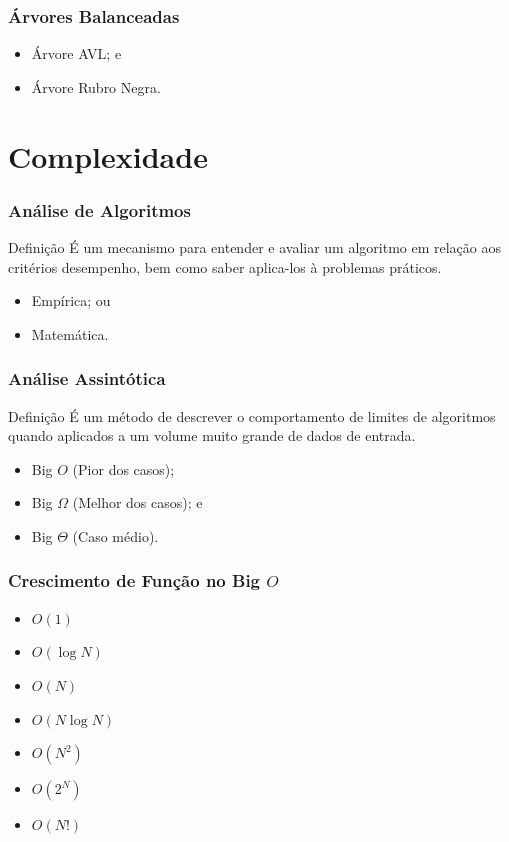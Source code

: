 \documentclass{beamer}
\begin{document}
\begin{frame}
\frametitle{Árvores Balanceadas}
\begin{itemize}
	\item Árvore AVL; e
	\item Árvore Rubro Negra.
\end{itemize}
\end{frame}

\section{Complexidade}

\begin{frame}
\frametitle{Análise de Algoritmos}

\begin{block}{Definição}
É um mecanismo para entender e avaliar um algoritmo em relação aos critérios desempenho, bem como saber aplica-los à problemas práticos.
\end{block}\vfill

\begin{itemize}
	\item Empírica; ou 
	\item Matemática.
\end{itemize}
\end{frame}

\begin{frame}
\frametitle{Análise Assintótica}

\begin{block}{Definição}
É um método de descrever o comportamento de limites de algoritmos quando aplicados a um volume muito grande de dados de entrada.
\end{block}\vfill

\begin{itemize}
	\item Big $O$ (Pior dos casos);
	\item Big $\Omega$ (Melhor dos casos); e
	\item Big $\Theta$ (Caso médio).
\end{itemize}
\end{frame}

\begin{frame}
\frametitle{Crescimento de Função no Big $O$}
\begin{itemize}
	\item $O(1)$
	\item $O(\log N)$
	\item $O(N)$
	\item $O(N \log N)$
	\item $O(N^{2})$
	\item $O(2^{N})$
	\item $O(N!)$
\end{itemize}
\end{frame}
\end{document}
